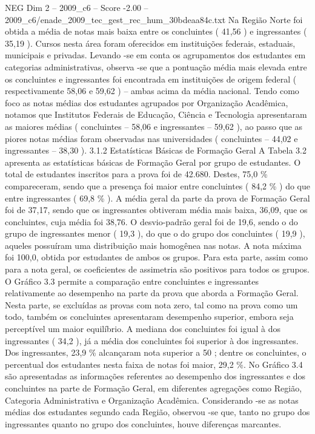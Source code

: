 \begin{textsample}{NEG Dim 2 – 2009\_c6 – Score -2.00 – 2009\_c6/enade\_2009\_tec\_gest\_rec\_hum\_30bdeaa84c.txt}
Na Região Norte foi obtida a média de notas mais baixa entre os concluintes ( 41,56 ) e ingressantes ( 35,19 ).
Cursos nesta área foram oferecidos em instituições federais, estaduais, municipais e privadas.
Levando -se em conta os agrupamentos dos estudantes em categorias administrativas, observa -se que a pontuação média mais elevada entre os concluintes e ingressantes foi encontrada em instituições de origem federal ( respectivamente 58,06 e 59,62 ) – ambas acima da média nacional.
Tendo como foco as notas médias dos estudantes agrupados por Organização Acadêmica, notamos que Institutos Federais de Educação, Ciência e Tecnologia apresentaram as maiores médias ( concluintes – 58,06 e ingressantes – 59,62 ), ao passo que as piores notas médias foram observadas nas universidades ( concluintes – 44,02 e ingressantes – 38,30 ). 3.1.2 Estatísticas Básicas de Formação Geral A Tabela 3.2 apresenta as estatísticas básicas de Formação Geral por grupo de estudantes.
O total de estudantes inscritos para a prova foi de 42.680.
Destes, 75,0 \% compareceram, sendo que a presença foi maior entre concluintes ( 84,2 \% ) do que entre ingressantes ( 69,8 \% ).
A média geral da parte da prova de Formação Geral foi de 37,17, sendo que os ingressantes obtiveram média mais baixa, 36,09, que os concluintes, cuja média foi 38,76.
O desvio-padrão geral foi de 19,6, sendo o do grupo de ingressantes menor ( 19,3 ), do que o do grupo dos concluintes ( 19,9 ), aqueles possuíram uma distribuição mais homogênea nas notas.
A nota máxima foi 100,0, obtida por estudantes de ambos os grupos.
Para esta parte, assim como para a nota geral, os coeficientes de assimetria são positivos para todos os grupos.
O Gráfico 3.3 permite a comparação entre concluintes e ingressantes relativamente ao desempenho na parte da prova que aborda a Formação Geral.
Nesta parte, se excluídas as provas com nota zero, tal como na prova como um todo, também os concluintes apresentaram desempenho superior, embora seja perceptível um maior equilíbrio.
A mediana dos concluintes foi igual à dos ingressantes ( 34,2 ), já a média dos concluintes foi superior à dos ingressantes.
Dos ingressantes, 23,9 \% alcançaram nota superior a 50 ; dentre os concluintes, o percentual dos estudantes nesta faixa de notas foi maior, 29,2 \%.
No Gráfico 3.4 são apresentadas as informações referentes ao desempenho dos ingressantes e dos concluintes na parte de Formação Geral, em diferentes agregações como Região, Categoria Administrativa e Organização Acadêmica.
Considerando -se as notas médias dos estudantes segundo cada Região, observou -se que, tanto no grupo dos ingressantes quanto no grupo dos concluintes, houve diferenças marcantes.

\end{textsample}
